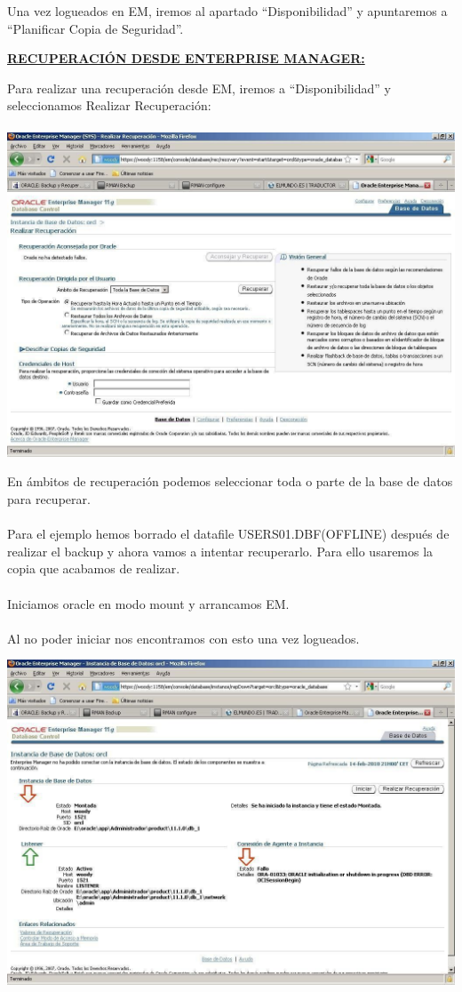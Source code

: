 \documentclass[12pt,letterpaper]{article}
\begin{document}
{Una vez logueados en EM, iremos al apartado “Disponibilidad” y apuntaremos a
“Planificar Copia de Seguridad”.

\begin{enumerate}
\bf\underline{RECUPERACIÓN  DESDE  ENTERPRISE  MANAGER:}
\end{enumerate}
Para realizar una recuperación desde EM, iremos a “Disponibilidad” y seleccionamos Realizar Recuperación: \\
\\
\includegraphics[width=14cm]{./IMG/img40.jpg}

En ámbitos de recuperación podemos seleccionar toda o parte de la base de datos para recuperar. \\
\\
Para  el  ejemplo  hemos  borrado  el  datafile  USERS01.DBF(OFFLINE)  después  de realizar el backup y ahora vamos a intentar recuperarlo. Para ello usaremos la copia que acabamos de realizar. \\
\\
Iniciamos oracle en modo mount y arrancamos EM. \\
\\
Al no poder iniciar nos encontramos con esto una vez logueados.

\includegraphics[width=14cm]{./IMG/img41.jpg}

}
\end{document}
